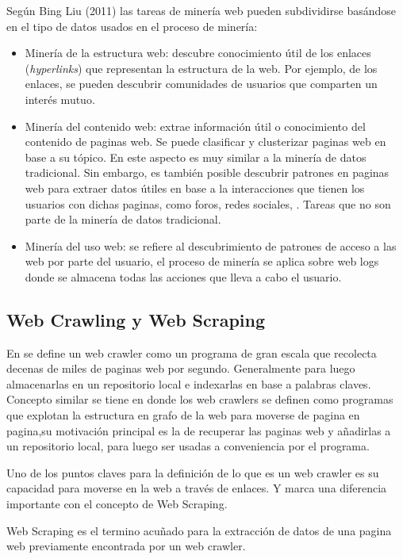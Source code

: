 Según Bing Liu (2011) las tareas de minería web pueden subdividirse basándose en el tipo de datos usados en el proceso de minería:
\begin{itemize}
\item Minería de la estructura web: descubre conocimiento útil de los enlaces (\emph{hyperlinks}) que representan la estructura de la web. Por ejemplo, de los enlaces, se pueden descubrir comunidades de usuarios que comparten un interés mutuo.
\item Minería del contenido web: extrae información útil o conocimiento del contenido de paginas web. Se puede clasificar y clusterizar paginas web en base a su tópico. En este aspecto es muy similar a la minería de datos tradicional. Sin embargo, es también posible descubrir patrones en paginas web para extraer datos útiles en base a la interacciones que tienen los usuarios con dichas paginas, como foros, redes sociales,  . Tareas que no son parte de la minería de datos tradicional.
\item Minería del uso web: se refiere al descubrimiento de patrones de acceso a las web por parte del usuario, el proceso de minería se aplica sobre web logs donde se almacena todas las acciones que lleva a cabo el usuario.
\end{itemize}

\subsection{Web Crawling y Web Scraping}

En \cite{crawlingwebCho} se define un web crawler como un programa de gran escala que recolecta decenas de miles de paginas web por segundo. Generalmente para luego almacenarlas en un repositorio local e indexarlas en base a palabras claves. Concepto similar se tiene en \cite{crawlingwebPant} donde los web crawlers se definen como programas que explotan la estructura en grafo de la web para moverse de pagina en pagina,su motivación principal es la de recuperar las paginas web y añadirlas a un repositorio local, para luego ser usadas a conveniencia por el programa.

Uno de los puntos claves para la definición de lo que es un web crawler es su capacidad para moverse en la web a través de enlaces. Y marca una diferencia importante con el concepto de Web Scraping. 

Web Scraping es el termino acuñado para la extracción de datos de una pagina web previamente encontrada por un web crawler.\cite{webscrapLawson}


